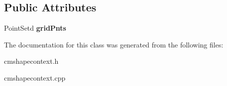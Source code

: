 \subsection*{Public Attributes}
\begin{DoxyCompactItemize}
\item 
Point\+Setd {\bfseries grid\+Pnts}\hypertarget{class_cm_shape_context_aeeec0906d70a3209d7eba947661d8409}{}\label{class_cm_shape_context_aeeec0906d70a3209d7eba947661d8409}

\end{DoxyCompactItemize}


The documentation for this class was generated from the following files\+:\begin{DoxyCompactItemize}
\item 
cmshapecontext.\+h\item 
cmshapecontext.\+cpp\end{DoxyCompactItemize}
